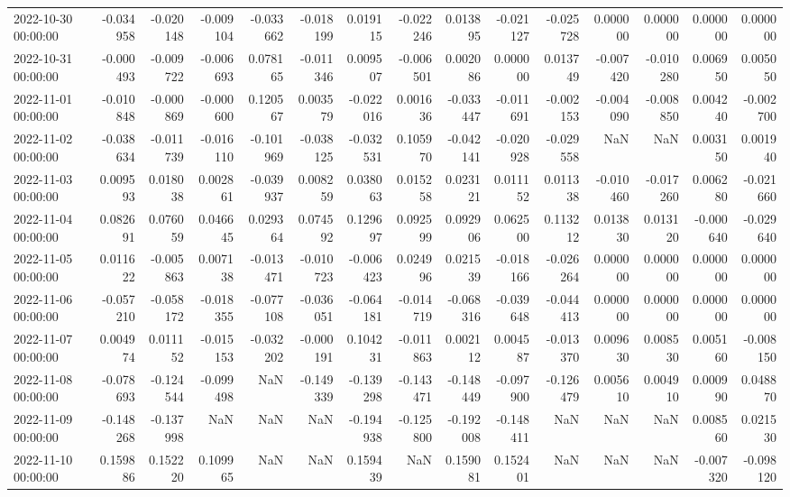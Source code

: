 \begin{tabular}{lrrrrrrrrrrrrrr}
2022-10-30 00:00:00 & -0.034958 & -0.020148 & -0.009104 & -0.033662 & -0.018199 & 0.019115 & -0.022246 & 0.013895 & -0.021127 & -0.025728 & 0.000000 & 0.000000 & 0.000000 & 0.000000 \\
2022-10-31 00:00:00 & -0.000493 & -0.009722 & -0.006693 & 0.078165 & -0.011346 & 0.009507 & -0.006501 & 0.002086 & 0.000000 & 0.013749 & -0.007420 & -0.010280 & 0.006950 & 0.005050 \\
2022-11-01 00:00:00 & -0.010848 & -0.000869 & -0.000600 & 0.120567 & 0.003579 & -0.022016 & 0.001636 & -0.033447 & -0.011691 & -0.002153 & -0.004090 & -0.008850 & 0.004240 & -0.002700 \\
2022-11-02 00:00:00 & -0.038634 & -0.011739 & -0.016110 & -0.101969 & -0.038125 & -0.032531 & 0.105970 & -0.042141 & -0.020928 & -0.029558 & NaN & NaN & 0.003150 & 0.001940 \\
2022-11-03 00:00:00 & 0.009593 & 0.018038 & 0.002861 & -0.039937 & 0.008259 & 0.038063 & 0.015258 & 0.023121 & 0.011152 & 0.011338 & -0.010460 & -0.017260 & 0.006280 & -0.021660 \\
2022-11-04 00:00:00 & 0.082691 & 0.076059 & 0.046645 & 0.029364 & 0.074592 & 0.129697 & 0.092599 & 0.092906 & 0.062500 & 0.113212 & 0.013830 & 0.013120 & -0.000640 & -0.029640 \\
2022-11-05 00:00:00 & 0.011622 & -0.005863 & 0.007138 & -0.013471 & -0.010723 & -0.006423 & 0.024996 & 0.021539 & -0.018166 & -0.026264 & 0.000000 & 0.000000 & 0.000000 & 0.000000 \\
2022-11-06 00:00:00 & -0.057210 & -0.058172 & -0.018355 & -0.077108 & -0.036051 & -0.064181 & -0.014719 & -0.068316 & -0.039648 & -0.044413 & 0.000000 & 0.000000 & 0.000000 & 0.000000 \\
2022-11-07 00:00:00 & 0.004974 & 0.011152 & -0.015153 & -0.032202 & -0.000191 & 0.104231 & -0.011863 & 0.002112 & 0.004587 & -0.013370 & 0.009630 & 0.008530 & 0.005160 & -0.008150 \\
2022-11-08 00:00:00 & -0.078693 & -0.124544 & -0.099498 & NaN & -0.149339 & -0.139298 & -0.143471 & -0.148449 & -0.097900 & -0.126479 & 0.005610 & 0.004910 & 0.000990 & 0.048870 \\
2022-11-09 00:00:00 & -0.148268 & -0.137998 & NaN & NaN & NaN & -0.194938 & -0.125800 & -0.192008 & -0.148411 & NaN & NaN & NaN & 0.008560 & 0.021530 \\
2022-11-10 00:00:00 & 0.159886 & 0.152220 & 0.109965 & NaN & NaN & 0.159439 & NaN & 0.159081 & 0.152401 & NaN & NaN & NaN & -0.007320 & -0.098120 \\

\end{tabular}
